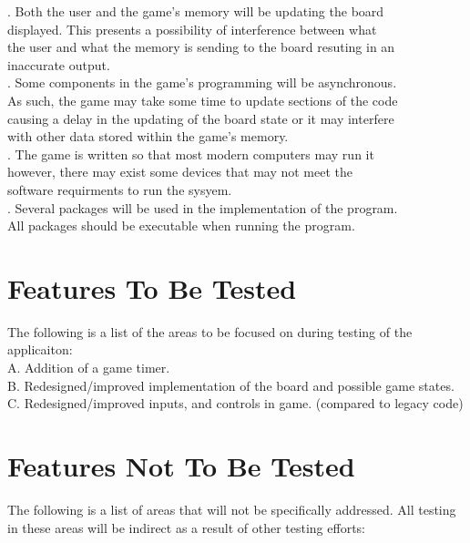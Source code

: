 \documentclass[12pt, letterpaper]{article}
\begin{document}
	. \indent Both the user and the game's memory will be updating the board\\
	\indent \indent displayed. This presents a possibility of interference between what\\
	\indent \indent the user and what the memory is sending to the board resuting in an\\ 
	\indent \indent inaccurate output.\\
	
	. \indent Some components in the game's programming will be asynchronous.\\
	\indent \indent As such, the game may take some time to update sections of the code\\
	\indent \indent causing a delay in the updating of the board state or it may interfere\\
	\indent \indent with other data stored within the game's memory.\\
	
	. \indent The game is written so that most modern computers may run it\\
	\indent \indent however, there may exist some devices that may not meet the\\
	\indent \indent software requirments to run the sysyem.\\
	
	. \indent Several packages will be used in the implementation of the program.\\
	\indent \indent All packages should be executable when running the program.
	
	\section{Features To Be Tested}
	The following is a list of the areas to be focused on during testing of the applicaiton:\\
	\noindent A. \indent Addition of a game timer.\\
	\noindent B. \indent Redesigned/improved implementation of the board and possible game \indent \indent states.\\
	\noindent C. \indent Redesigned/improved inputs, and controls in game. (compared to legacy code)\\
	
	\section{Features Not To Be Tested}
	The following is a list of areas that will not be specifically addressed. All testing in these areas will be indirect as a result of other testing efforts:\\
	
\end{document}
